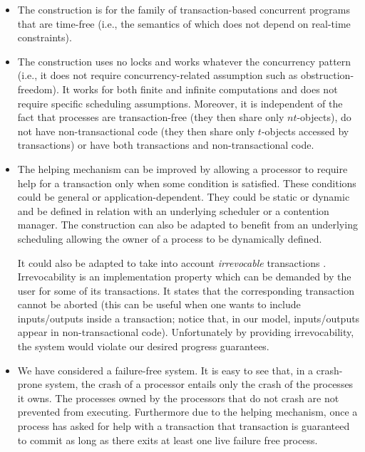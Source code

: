 \begin{itemize}

\item  The construction is for the family of transaction-based concurrent
programs  that are time-free (i.e., the semantics of which does not depend 
on real-time constraints). 

\item 
The construction  uses no locks and  works whatever the concurrency pattern
(i.e., it does not require concurrency-related  assumption such as 
obstruction-freedom). It  works for  both finite  and  infinite
computations and does not require  specific scheduling assumptions.  
%
Moreover,  it is  independent of the fact that 
processes  are  transaction-free (they then share  only
$nt$-objects),  do not have  non-transactional code (they then  share 
only $t$-objects  accessed by transactions)  or have both  transactions and
non-transactional code.  

\item  
The helping mechanism can be improved by allowing a processor to 
require help for a transaction only when  some condition is satisfied. 
These  conditions could be general or application-dependent. They could 
be static or dynamic and  be  defined in relation with an underlying
scheduler or a contention manager. 
The construction can also be  adapted  to benefit from an underlying 
scheduling allowing the owner of a process to be  dynamically defined.  

It could also be adapted to  take into account {\it irrevocable} transactions
\cite{SSDMS08,WSA08}. 
Irrevocability is an implementation property which can be 
demanded by the user for  some of its transactions. It states that 
the corresponding transaction cannot be aborted (this can be useful when 
one wants to include inputs/outputs inside a transaction; notice that, 
in our model, inputs/outputs appear in non-transactional code).
Unfortunately by providing irrevocability, the system would violate our desired progress
guarantees.

\item  
We have considered a failure-free system. It is easy to see that, in a
 crash-prone system, the crash of a processor entails only the
crash of the processes it owns.  The processes owned by the processors that
do not crash are not prevented from executing.
Furthermore due to the helping mechanism, once a process has asked
for help with a transaction that transaction is guaranteed to commit
as long as there exits at least one live failure free process.
\end{itemize}

